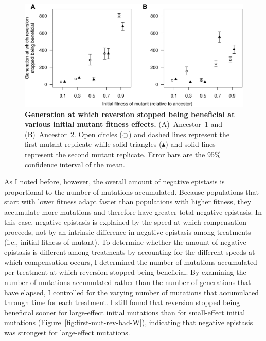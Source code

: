 \begin{doublespace}
\begin{figure}[b!]
\begin{center}
\includegraphics[width=\linewidth]{first-update-rev-bad-W.pdf}
\end{center}
\caption{{\bf Generation at which reversion stopped being beneficial
  at various initial mutant fitness effects.}
  (A)~Ancestor~1 and (B)~Ancestor~2.
  Open circles ($\ocircle$) and dashed lines
  represent the first mutant replicate
  while solid triangles ($\blacktriangle$) and solid lines
  represent the second mutant replicate.
  Error bars are the 95\% confidence interval of the mean.}
\label{fig:first-update-rev-bad-W}
\end{figure}



As I noted before, however, the overall amount of negative epistasis
is proportional to the number of mutations accumulated.
%
Because populations that start with lower fitness adapt faster
than populations with higher fitness, they accumulate more mutations
and therefore have greater total negative epistasis.
%
In this case, negative epistasis is explained by the speed
at which compensation proceeds,
not by an intrinsic difference in negative epistasis
among treatments (i.e., initial fitness of mutant).
%
To determine whether the amount of negative epistasis
is different among treatments by accounting for the different
speeds at which compensation occurs,
I determined the number of mutations accumulated per treatment
at which reversion stopped being beneficial.
%
By examining the number of mutations accumulated
rather than the number of generations that have elapsed,
I controlled for the varying number of mutations
that accumulated through time for each treatment.
%
I still found that reversion stopped being beneficial sooner
for large-effect initial mutations than for small-effect initial mutations
(Figure~\ref{fig:first-mut-rev-bad-W}),
indicating that negative epistasis was strongest for large-effect mutations.




\end{doublespace}
